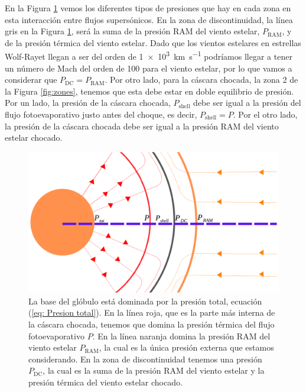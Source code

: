 \documentclass{book}
\begin{document}
En la Figura \ref{fig:zones_presiones} vemos los diferentes tipos de presiones que hay en cada zona en esta interacción entre flujos supersónicos. En la zona de discontinuidad, la línea gris en la Figura \ref{fig:zones_presiones}, será la suma de la presión RAM del viento estelar, $P_\mathrm{RAM}$, y de la presión térmica del viento estelar. Dado que los vientos estelares en estrellas Wolf-Rayet llegan a ser del orden de \SI{1e3}{km.s^{-1}} podríamos llegar a tener un número de Mach del orden de 100 para el viento estelar, por lo que vamos a considerar que $P_\mathrm{DC}=P_\mathrm{RAM}$. Por otro lado, para la cáscara chocada, la zona 2 de la Figura \ref{fig:zones}, tenemos que esta debe estar en doble equilibrio de presión. Por un lado, la presión de la cáscara chocada, $P_\mathrm{shell}$ debe ser igual a la presión del flujo fotoevaporativo justo antes del choque, es decir, $P_\mathrm{shell}=P$. Por el otro lado, la presión de la cáscara chocada debe ser igual a la presión RAM del viento estelar chocado.

\begin{figure}[htb]
    \centering    \includegraphics[width=\textwidth]{imagenes_corregidas/Arreglo 03.pdf}
    \caption{La base del glóbulo está dominada por la presión total, ecuación (\ref{eq: Presion total}). En la línea roja, que es la parte más interna de la cáscara chocada, tenemos que domina la presión térmica del flujo fotoevaporativo $P$. En la línea naranja domina la presión RAM del viento estelar $P_\mathrm{RAM}$, la cual es la única presión externa que estamos considerando. En la zona de discontinuidad tenemos una presión $P_\mathrm{DC}$, la cual es la suma de la presión RAM del viento estelar y la presión térmica del viento estelar chocado. }
    \label{fig:zones_presiones}
\end{figure}
\end{document}
